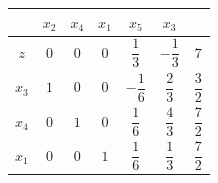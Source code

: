 \documentclass[a4paper]{extarticle}
\renewcommand\arraystretch{}
\begin{document}
\vspace{1em}
\noindent
\begin{table}[H]
    \setlength{\tabcolsep}{4pt}
    \renewcommand{\arraystretch}{2.2}
    \noindent
    \centering
    \begin{tabular}{|c|ccc|cc|c|}
        & $x_2$ & $x_4$ & $x_1$ & $x_5$ & $x_3$ &\\
        \hline
        $z$ & $0$ & $0$ & $0$ & $\dfrac{1}{3}$ & $-\dfrac{1}{3}$ & $7$\\
        \hline
        $x_3$ & \cellcolor{red!50!white}$1$ & \cellcolor{red!50!white}$0$ & \cellcolor{red!50!white}$0$ & \cellcolor{blue!50!white}$-\dfrac{1}{6}$ & \cellcolor{blue!50!white}$\dfrac{2}{3}$ & \cellcolor{orange!25!white}$\dfrac{3}{2}$\\
        $x_4$ & \cellcolor{red!50!white}$0$ & \cellcolor{red!50!white}$1$ & \cellcolor{red!50!white}$0$ & \cellcolor{blue!50!white}$\dfrac{1}{6}$ & \cellcolor{blue!50!white}$\dfrac{4}{3}$ & \cellcolor{orange!25!white}$\dfrac{7}{2}$\\
        $x_1$ & \cellcolor{red!50!white}$0$ & \cellcolor{red!50!white}$0$ & \cellcolor{red!50!white}$1$ & \cellcolor{blue!50!white}$\dfrac{1}{6}$ & \cellcolor{blue!50!white}$\dfrac{1}{3}$ & \cellcolor{orange!25!white}$\dfrac{7}{2}$\\
        \hline
    \end{tabular}
\end{table}
\end{document}
